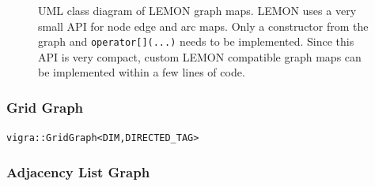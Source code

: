 \begin{figure}[H]
\begin{center}
    \end{center}
    \caption{
        UML class diagram of LEMON graph maps.
        LEMON uses a very small API for node edge and arc maps.
        Only a constructor from the graph and \lstinline{operator[](...)}
        needs to be implemented.
        Since this API is very compact, custom LEMON compatible graph 
        maps can be implemented within a few lines of code.
    }\label{fig:uml_lemon_graph_maps}
    \end{figure}




\subsubsection{Grid Graph} \label{sec:graphs_grid_graph}


    \lstinline{vigra::GridGraph<DIM,DIRECTED_TAG>}

\subsubsection{Adjacency List Graph} \label{sec:graphs_adjacency_list_graph}


